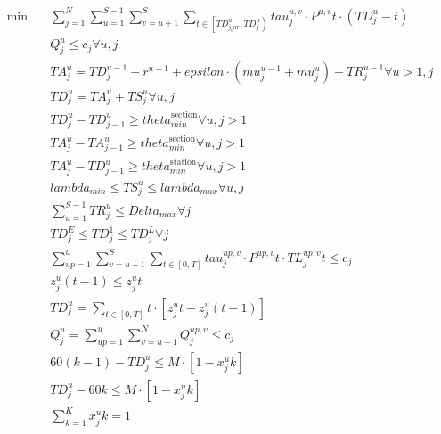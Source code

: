 \begin{align}
  \min\quad & \sum_{j = 1}^{N} \sum_{u = 1}^{S - 1} \sum_{v = u + 1}^{S} \underset{t \in \left[\mathit{TD}_{j_bar}^{u} , \mathit{TD}_{j}^{u}\right)}{\sum} \mathit{tau}_{j}^{u , v} \cdot P^{u , v} t \cdot \left(\mathit{TD}_{j}^{u} - t\right) \tag{eq\_0005} \\
  & Q_{j}^{u} \leq c_{j} \forall u , j \tag{eq\_0009} \\
  & \mathit{TA}_{j}^{u} = \mathit{TD}_{j}^{u - 1} + r^{u - 1} + \mathit{epsilon} \cdot \left(\mathit{mu}_{j}^{u - 1} + \mathit{mu}_{j}^{u}\right) + \mathit{TR}_{j}^{u - 1} \forall u > 1 , j \tag{eq\_0010} \\
  & \mathit{TD}_{j}^{u} = \mathit{TA}_{j}^{u} + \mathit{TS}_{j}^{u} \forall u , j \tag{eq\_0011} \\
  & \mathit{TD}_{j}^{u} - \mathit{TD}_{j - 1}^{u} \geq \mathit{theta}_{min}^{\text{section}} \forall u , j > 1 \tag{eq\_0012} \\
  & \mathit{TA}_{j}^{u} - \mathit{TA}_{j - 1}^{u} \geq \mathit{theta}_{min}^{\text{section}} \forall u , j > 1 \tag{eq\_0013} \\
  & \mathit{TA}_{j}^{u} - \mathit{TD}_{j - 1}^{u} \geq \mathit{theta}_{min}^{\text{station}} \forall u , j > 1 \tag{eq\_0014} \\
  & \mathit{lambda}_{min} \leq \mathit{TS}_{j}^{u} \leq \mathit{lambda}_{max} \forall u , j \tag{eq\_0015} \\
  & \sum_{u = 1}^{S - 1} \mathit{TR}_{j}^{u} \leq \mathit{Delta}_{max} \forall j \tag{eq\_0016} \\
  & \mathit{TD}_{j}^{E} \leq \mathit{TD}_{j}^{1} \leq \mathit{TD}_{j}^{L} \forall j \tag{eq\_0017} \\
  & \sum_{up = 1}^{u} \sum_{v = u + 1}^{S} \sum_{t \in \left[0 , T\right]} \mathit{tau}_{j}^{up , v} \cdot P^{up , v} t \cdot \mathit{TL}_{j}^{up , v} t \leq c_{j} \tag{eq\_0020} \\
  & z_{j}^{u} \left(t - 1\right) \leq z_{j}^{u} t \tag{eq\_0021} \\
  & \mathit{TD}_{j}^{u} = \sum_{t \in \left[0 , T\right]} t \cdot \left[z_{j}^{u} t - z_{j}^{u} \left(t - 1\right)\right] \tag{eq\_0022} \\
  & Q_{j}^{u} = \sum_{up = 1}^{u} \sum_{v = u + 1}^{N} Q_{j}^{up , v} \leq c_{j} \tag{eq\_0032} \\
  & 60 \left(k - 1\right) - \mathit{TD}_{j}^{u} \leq M \cdot \left[1 - x_{j}^{u} k\right] \tag{eq\_0033} \\
  & \mathit{TD}_{j}^{u} - 60 k \leq M \cdot \left[1 - x_{j}^{u} k\right] \tag{eq\_0034} \\
  & \sum_{k = 1}^{K} x_{j}^{u} k = 1 \tag{eq\_0035} \\
\end{align}
